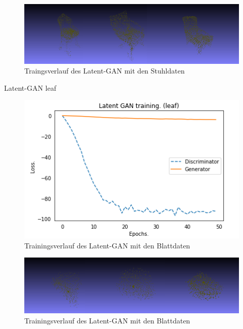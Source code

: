 \documentclass{llncs}
\begin{document}
\begin{figure}[htbp] 
	\centering
	\includegraphics[width=1.2\textwidth]{latent_gan_chair_example.png}
	\caption{Traingsverlauf des Latent-GAN mit den Stuhldaten}
	\label{fig:Bild38}
\end{figure}
Latent-GAN leaf
\begin{figure}[htbp] 
	\centering
	\includegraphics[width=1.2\textwidth]{Latent_gan_training_result.png}
	\caption{Trainingsverlauf des Latent-GAN mit den Blattdaten}
	\label{fig:Bild37}
\end{figure}
\begin{figure}[htbp] 
	\centering
	\includegraphics[width=1.2\textwidth]{latent_gan_leaf_example.png}
	\caption{Trainingsverlauf des Latent-GAN mit den Blattdaten}
	\label{fig:Bild38}
\end{figure}
\end{document}
